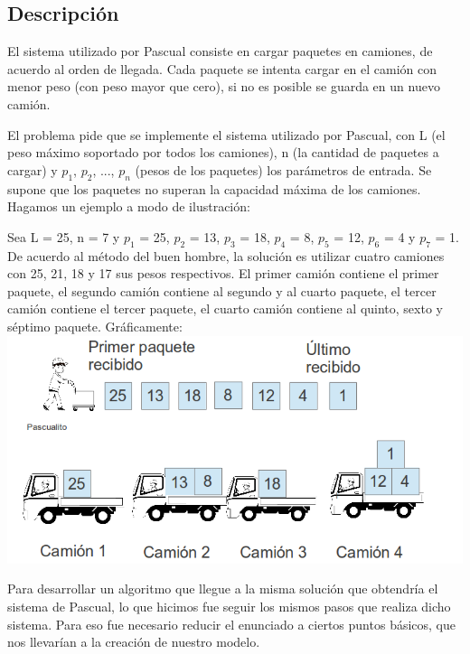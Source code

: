 \subsection{Descripci\'on}


El sistema utilizado por Pascual consiste en cargar paquetes en camiones, de acuerdo al orden de llegada. Cada paquete se intenta cargar en el cami\'on con menor peso (con peso mayor que cero), si no es posible se guarda en un nuevo cami\'on.

El problema pide que se implemente el sistema utilizado por Pascual, con L (el peso m\'aximo soportado por todos los camiones), n (la cantidad de paquetes a cargar) y $p_1$, $p_2$, ..., $p_n$ (pesos de los paquetes) los par\'ametros de entrada.  Se supone que los paquetes no superan la capacidad m\'axima de los camiones.
Hagamos un ejemplo a modo de ilustraci\'on:

Sea L = 25, n = 7 y $p_1$ = 25, $p_2$ = 13, $p_3$ = 18, $p_4$ = 8, $p_5$ = 12, $p_6$ = 4 y $p_7$ = 1.
De acuerdo al m\'etodo del buen hombre, la soluci\'on es utilizar cuatro camiones con 25, 21, 18 y 17 sus pesos respectivos. El primer cami\'on contiene el primer paquete, el segundo cami\'on contiene al segundo y al cuarto paquete, el tercer cami\'on contiene el tercer paquete, el cuarto cami\'on contiene al quinto, sexto y s\'eptimo paquete.
Gráficamente:
\includegraphics[scale=0.7]{ej1/Graficos/grafEj1.png} 

Para desarrollar un algoritmo que llegue a la misma soluci\'on que obtendr\'ia el sistema de Pascual, lo que hicimos fue seguir los mismos pasos que realiza dicho sistema. 
Para eso fue necesario reducir el enunciado a ciertos puntos b\'asicos, que nos llevar\'ian a la creaci\'on de nuestro modelo. 

